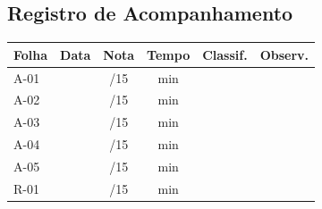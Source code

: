 \subsection{Registro de Acompanhamento}

\begin{center}
\begin{tabular}{|l|c|c|c|c|c|}
\hline
\textbf{Folha} & \textbf{Data} & \textbf{Nota} & \textbf{Tempo} & \textbf{Classif.} & \textbf{Observ.} \\
\hline
A-01 & \underline{\hspace{1.5cm}} & \underline{\hspace{1cm}}/15 & \underline{\hspace{1cm}}min & \underline{\hspace{1cm}} & \underline{\hspace{2cm}} \\
\hline
A-02 & \underline{\hspace{1.5cm}} & \underline{\hspace{1cm}}/15 & \underline{\hspace{1cm}}min & \underline{\hspace{1cm}} & \underline{\hspace{2cm}} \\
\hline
A-03 & \underline{\hspace{1.5cm}} & \underline{\hspace{1cm}}/15 & \underline{\hspace{1cm}}min & \underline{\hspace{1cm}} & \underline{\hspace{2cm}} \\
\hline
A-04 & \underline{\hspace{1.5cm}} & \underline{\hspace{1cm}}/15 & \underline{\hspace{1cm}}min & \underline{\hspace{1cm}} & \underline{\hspace{2cm}} \\
\hline
A-05 & \underline{\hspace{1.5cm}} & \underline{\hspace{1cm}}/15 & \underline{\hspace{1cm}}min & \underline{\hspace{1cm}} & \underline{\hspace{2cm}} \\
\hline
R-01 & \underline{\hspace{1.5cm}} & \underline{\hspace{1cm}}/15 & \underline{\hspace{1cm}}min & \underline{\hspace{1cm}} & \underline{\hspace{2cm}} \\

\end{tabular}
\end{center}
